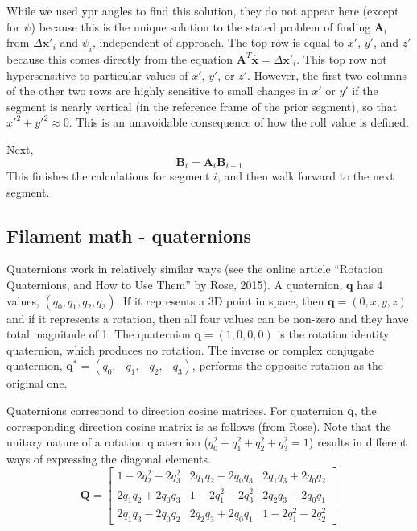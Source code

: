 \documentclass {scrbook}
\begin{document}
While we used ypr angles to find this solution, they do not appear here (except for $\psi$) because this is the unique solution to the stated problem of finding $\bm{A}_i$ from $\Delta \bm{x}'_i$ and $\psi_i$, independent of approach. The top row is equal to $x'$, $y'$, and $z'$ because this comes directly from the equation $\bm{A}^T\hat{\bm{x}} = \Delta \bm{x}'_i$. This top row not hypersensitive to particular values of $x'$, $y'$, or $z'$. However, the first two columns of the other two rows are highly sensitive to small changes in $x'$ or $y'$ if the segment is nearly vertical (in the reference frame of the prior segment), so that $x'^2 + y'^2 \approx 0$. This is an unavoidable consequence of how the roll value is defined.

Next,
$$\bm{B}_i = \bm{A}_i \bm{B}_{i-1}$$
This finishes the calculations for segment $i$, and then walk forward to the next segment.



\subsection{Filament math - quaternions}

Quaternions work in relatively similar ways (see the online article ``Rotation Quaternions, and How to Use Them'' by Rose, 2015). A quaternion, $\bm{q}$ has 4 values, $(q_0,q_1,q_2,q_3)$. If it represents a 3D point in space, then $\bm{q}=(0,x,y,z)$ and if it represents a rotation, then all four values can be non-zero and they have total magnitude of 1. The quaternion $\bm{q}=(1,0,0,0)$ is the rotation identity quaternion, which produces no rotation. The inverse or complex conjugate quaternion, $\bm{q}^* = (q_0,-q_1,-q_2,-q_3)$, performs the opposite rotation as the original one.

Quaternions correspond to direction cosine matrices. For quaternion $\bm{q}$, the corresponding direction cosine matrix is as follows (from Rose). Note that the unitary nature of a rotation quaternion ($q_0^2+q_1^2+q_2^2+q_3^2=1$) results in different ways of expressing the diagonal elements.
\begin{equation}
\bm{Q} = \left[ \begin{array}{ccc}
1-2q_2^2-2q_3^2 & 2q_1q_2-2q_0q_3 & 2q_1q_3+2q_0q_2\\
2q_1q_2+2q_0q_3 & 1-2q_1^2-2q_3^2 & 2q_2q_3-2q_0q_1\\
2q_1q_3-2q_0q_2 & 2q_2q_3+2q_0q_1 & 1-2q_1^2-2q_2^2
\end{array} \right]
\label{eq:qtn2dcm}
\end{equation}
\end{document}
